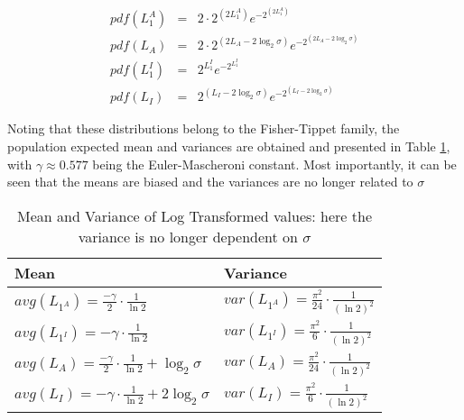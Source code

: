 \begin{eqnarray}
pdf(L_{1}^{A}) &=& 2 \cdot 2^{\left( 2 L_{1}^{A} \right)}e^{-2^{\left( 2 L_{1}^{A} \right) }} \\
pdf(L_A) &=& 2 \cdot 2^{\left( 2 L_A - 2 \log_2 \sigma \right)}e^{-2^{\left( 2 L_A - 2 \log_2 \sigma \right)}} \\ 
pdf(L_{1}^{I}) &=& 2^{L_1^I} e^{-2^{L_1^I}}  \\
pdf(L_I) &=& 2^{\left( L_I - 2 \log_2 \sigma \right)} e^{-2^{\left( L_I - 2 \log_2 \sigma \right)} }  
\end{eqnarray}

Noting that these distributions belong to the Fisher-Tippet family, the population expected mean and variances 
are obtained and presented in Table \ref{tbl:sar_log_domain_avg_var}, with $\gamma \approx 0.577$ being the Euler-Mascheroni constant. 
Most importantly, it can be seen that the means are biased and the variances are no longer related to $\sigma$ 

\begin{table}[h]
\normalsize
\centering

\begin{tabular}{|l|l|}
\hline
Mean & Variance \\
\hline
$avg(L_{1^A}) = \frac{ - \gamma }{2} \cdot \frac{1}{\ln2}$ & $var(L_{1^A}) = \frac{ \pi ^2}{24} \cdot \frac{1}{(\ln2)^2}$ \\
$avg(L_{1^I}) = - \gamma \cdot \frac{1}{\ln2} $ & $var(L_{1^I}) = \frac{ \pi ^2}{6} \cdot \frac{1}{(\ln2)^2} $ \\
$avg(L_A) = \frac{ - \gamma }{2} \cdot \frac{1}{\ln2} + \log_2{\sigma}$ & $var(L_A) = \frac{ \pi ^2}{24} \cdot \frac{1}{(\ln2)^2}$ \\
$avg(L_I) = - \gamma \cdot \frac{1}{\ln2} + 2 \log_2{\sigma}  $ & $ var(L_I) = \frac{ \pi ^2}{6} \cdot \frac{1}{(\ln2)^2}$ \\
\hline
\end{tabular}

\caption{ Mean and Variance of Log Transformed values: here the variance is no longer dependent on $\sigma$ }
\label{tbl:sar_log_domain_avg_var}
\end{table}

